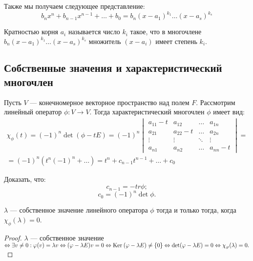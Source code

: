 Также мы получаем следующее представление:
$$
b_nx^n + b_{n-1}x^{n-1} + \ldots + b_0 = b_n(x - a_1)^{k_1}\ldots(x - a_s)^{k_s}
$$

\begin{Def}
	Кратностью корня $a_i$ называется число $k_i$ такое, что в многочлене \\$b_n(x - a_1)^{k_1}\ldots(x - a_s)^{k_s}$ множитель $(x - a_i)$ имеет степень $k_i$.
\end{Def}

\subsection*{Собственные значения и характеристический многочлен}

\begin{Def}
	Пусть $V$ --- конечномерное векторное пространство над полем $F$. Рассмотрим линейный оператор $\phi: V \to V$. Тогда характеристический многочлен $\phi$ имеет вид:
	\begin{gather*}
	\chi_{\phi}(t) = (-1)^n\det(\phi - tE) = (-1)^n
  \begin{vmatrix}
  a_{11} - t & a_{12} &\ldots &a_{1n}\\
  a_{21} & a_{22} - t &\ldots &a_{2n} \\
  \vdots &\vdots &\ddots &\vdots\\
  a_{n1} &a_{n2} &\ldots & a_{nn} - t
  \end{vmatrix}
  = \\ 
  = (-1)^n(t^n(-1)^n + \ldots)  = t^n + c_{n-1}t^{n-1} + \ldots + c_0
  \end{gather*}
\end{Def}

\begin{Task}
Доказать, что:
	\[c_{n-1} = -tr\phi;\]
        \[c_0 = (-1)^n \det\phi.\]
\end{Task}

\begin{Suggestion}
	$\lambda$ --- собственное значение линейного оператора $\phi$ тогда и только тогда, когда $\chi_\phi(\lambda) = 0$. 
\end{Suggestion}

\begin{proof}
	$\lambda$ --- собственное значение $\Leftrightarrow \exists v \neq 0 : \varphi(v) = \lambda {v} \Leftrightarrow (\varphi - \lambda {E})v = 0 \Leftrightarrow \mathrm{Ker}\:(\varphi - \lambda {E}) \neq \{0\}
	\Leftrightarrow \det(\varphi - \lambda {E}) = 0 \Leftrightarrow \chi_\varphi(\lambda) = 0.$
\end{proof}

